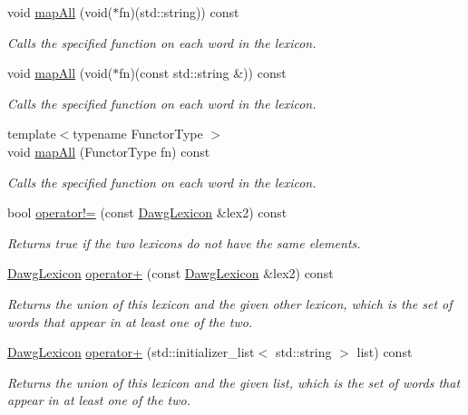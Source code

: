 \begin{DoxyCompactItemize}
void \mbox{\hyperlink{classDawgLexicon_a2e4e14ffb291ba4d5475b9b66d2a12c8}{map\+All}} (void($\ast$fn)(std\+::string)) const
\begin{DoxyCompactList}\small\item\em Calls the specified function on each word in the lexicon. \end{DoxyCompactList}\item 
void \mbox{\hyperlink{classDawgLexicon_abab83598d63d43b15cf018fa020e1ddf}{map\+All}} (void($\ast$fn)(const std\+::string \&)) const
\begin{DoxyCompactList}\small\item\em Calls the specified function on each word in the lexicon. \end{DoxyCompactList}\item 
{\footnotesize template$<$typename Functor\+Type $>$ }\\void \mbox{\hyperlink{classDawgLexicon_a8dc32c1e45704cfae41daf8adb4e66dc}{map\+All}} (Functor\+Type fn) const
\begin{DoxyCompactList}\small\item\em Calls the specified function on each word in the lexicon. \end{DoxyCompactList}\item 
bool \mbox{\hyperlink{classDawgLexicon_a8d198a4165303f1e4877005141c43e31}{operator!=}} (const \mbox{\hyperlink{classDawgLexicon}{Dawg\+Lexicon}} \&lex2) const
\begin{DoxyCompactList}\small\item\em Returns true if the two lexicons do not have the same elements. \end{DoxyCompactList}\item 
\mbox{\hyperlink{classDawgLexicon}{Dawg\+Lexicon}} \mbox{\hyperlink{classDawgLexicon_ad1dee5fbe47180dbadb3952bb37643ae}{operator+}} (const \mbox{\hyperlink{classDawgLexicon}{Dawg\+Lexicon}} \&lex2) const
\begin{DoxyCompactList}\small\item\em Returns the union of this lexicon and the given other lexicon, which is the set of words that appear in at least one of the two. \end{DoxyCompactList}\item 
\mbox{\hyperlink{classDawgLexicon}{Dawg\+Lexicon}} \mbox{\hyperlink{classDawgLexicon_a41fac68795179c64eea3dc4c86a30814}{operator+}} (std\+::initializer\+\_\+list$<$ std\+::string $>$ list) const
\begin{DoxyCompactList}\small\item\em Returns the union of this lexicon and the given list, which is the set of words that appear in at least one of the two. \end{DoxyCompactList}\item 

\end{DoxyCompactItemize}
